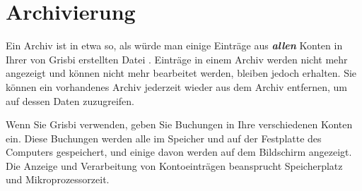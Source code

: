 \section{Archivierung\label{datamanagement-archive}}%

Ein Archiv ist in etwa so, als würde man einige Einträge aus \textit{\textbf{allen}} Konten in Ihrer von Grisbi erstellten Datei . Einträge in einem Archiv werden nicht mehr angezeigt und können nicht mehr bearbeitet werden, bleiben jedoch erhalten. Sie können ein vorhandenes Archiv jederzeit wieder aus dem Archiv entfernen, um auf dessen Daten zuzugreifen.

\vspace{.2em}
Wenn Sie Grisbi verwenden, geben Sie Buchungen in Ihre verschiedenen Konten ein. Diese Buchungen werden alle im Speicher und auf der Festplatte des Computers gespeichert, und einige davon werden auf dem Bildschirm angezeigt. Die Anzeige und Verarbeitung von Kontoeinträgen beansprucht Speicherplatz und Mikroprozessorzeit.

